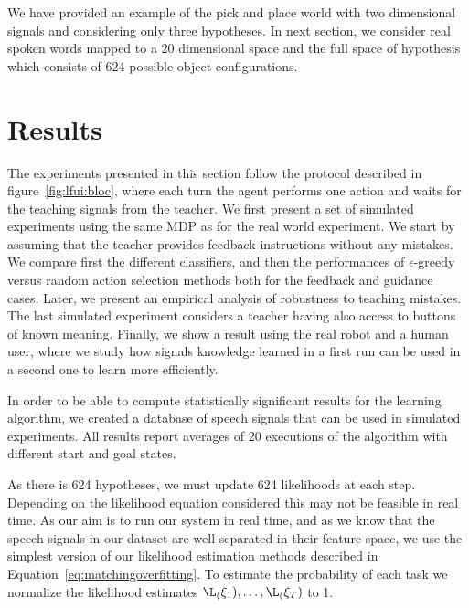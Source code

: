 \transition

We have provided an example of the pick and place world with two dimensional signals and considering only three hypotheses. In next section, we consider real spoken words mapped to a 20 dimensional space and the full space of hypothesis which consists of 624 possible object configurations.

\section{Results}
\label{chapter:lfui:results}

The experiments presented in this section follow the protocol described in figure~\ref{fig:lfui:bloc}, where each turn the agent performs one action and waits for the teaching signals from the teacher. We first present a set of simulated experiments using the same MDP as for the real world experiment. We start by assuming that the teacher provides feedback instructions without any mistakes. %
We compare first the different classifiers, and then the performances of $\epsilon$-greedy versus random action selection methods both for the feedback and guidance cases. Later, we present an empirical analysis of robustness to teaching mistakes. The last simulated experiment considers a teacher having also access to buttons of known meaning. Finally, we show a result using the real robot and a human user, where we study how signals knowledge learned in a first run can be used in a second one to learn more efficiently.

In order to be able to compute statistically significant results for the learning algorithm, we created a database of speech signals that can be used in simulated experiments. All results report averages of 20 executions of the algorithm with different start and goal states. 

As there is 624 hypotheses, we must update 624 likelihoods at each step. Depending on the likelihood equation considered this may not be feasible in real time. As our aim is to run our system in real time, and as we know that the speech signals in our dataset are well separated in their feature space, we use the simplest version of our likelihood estimation methods described in Equation~\ref{eq:matchingoverfitting}. To estimate the probability of each task we normalize the likelihood estimates $\L_(\xi_1),\ldots,\L_(\xi_T)$ to 1.

